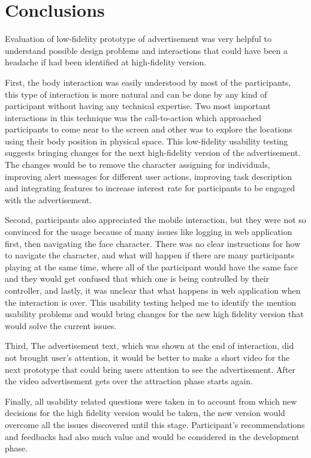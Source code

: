 \section{Conclusions}

Evaluation of low-fidelity prototype of advertisement was very helpful to understand possible design problems and interactions that could have been a headache if had been identified at high-fidelity version. 

First, the body interaction was easily understood by most of the participants, this type of interaction is more natural and can be done by any kind of participant without having any technical expertise. Two most important interactions in this technique was the call-to-action which approached participants to come near to the screen and other was to explore the locations using their body position in physical space. This low-fidelity usability testing suggests bringing changes for the next high-fidelity version of the advertisement. The changes would be to remove the character assigning for individuals, improving alert messages for different user actions, improving task description and integrating features to increase interest rate for participants to be engaged with the advertisement.

Second, participants also appreciated the mobile interaction, but they were not so convinced for the usage because of many issues like logging in web application first, then navigating the face character. There was no clear instructions for how to navigate the character, and what will happen if there are many participants playing at the same time, where all of the participant would have the same face and they would get confused that which one is being controlled by their controller, and lastly, it was unclear that what happens in web application when the interaction is over. This usability testing helped me to identify the mention usability problems and would bring changes for the new high fidelity version that would solve the current issues.

Third, The advertisement text, which was shown at the end of interaction, did not brought user’s attention, it would be better to make a short video for the next prototype that could bring users attention to see the advertisement. After the video advertisement gets over the attraction phase starts again.

Finally, all usability related questions were taken in to account from which new decisions for the high fidelity version would be taken, the new version would overcome all the issues discovered until this stage. Participant’s recommendations and feedbacks had also much value and would be considered in the development phase.

